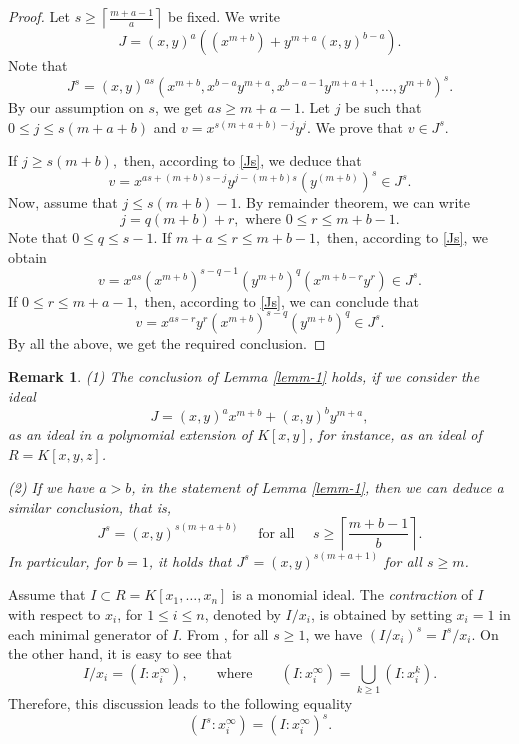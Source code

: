 \documentclass[11pt]{amsart}
\newtheorem{remark}[theorem]{Remark}
\begin{document}
\begin{proof}
Let  $s\geq \left\lceil \frac{m+a-1}{a} \right\rceil$ be fixed.
We write $$J=(x,y)^a ( (x^{m+b}) + y^{m+a}(x,y)^{b-a}).$$ Note that
\begin{equation}\label{Js}
J^s = (x,y)^{as}(x^{m+b},x^{b-a}y^{m+a},x^{b-a-1}y^{m+a+1},\ldots, y^{m+b})^s.
\end{equation}
By our assumption on $s$, we get $as\geq m+a-1$. Let $j$ be  such that \linebreak $0\leq j\leq s(m+a+b)$
and $v=x^{s(m+a+b)-j}y^j$. We prove that $v\in J^s$.  

If $j\geq s(m+b),$ then, according to \eqref{Js}, we deduce that 
$$v= x^{as+(m+b)s-j} y^{j-(m+b)s} (y^{(m+b)})^s \in J^s.$$
Now, assume that $j\leq s(m+b)-1$. By remainder theorem, we can write
$$j = q(m+b) + r,\text{ where }0\leq r \leq m+b-1.$$
Note that $0\leq q\leq s-1$. If $m+a\leq r\leq m+b-1,$ then, according to \eqref{Js}, we obtain 
$$v =  x^{as} (x^{m+b})^{s-q-1}(y^{m+b})^q (x^{m+b-r}y^r) \in J^s.$$
If $0 \leq r\leq m+a-1,$ then, according to \eqref{Js}, we can conclude that 
$$v =  x^{as-r} y^r (x^{m+b})^{s-q}(y^{m+b})^q \in J^s.$$ 
By all the above, we get the required conclusion.
\end{proof}

\begin{remark}\label{remmy}
(1) The conclusion of Lemma \ref{lemm-1} holds, if we consider the ideal 
$$J=(x,y)^a x^{m+b} + (x,y)^b y^{m+a},$$
as an ideal in a polynomial extension of $K[x,y]$, for instance, as an ideal of $R=K[x,y,z]$.

(2) If we have $a>b$, in the statement of Lemma \ref{lemm-1}, then we can deduce a similar conclusion, that is,  
$$J^s = (x,y)^{s(m+a+b)} \quad  \text{ for all }     \quad  s\geq \left\lceil \frac{m+b-1}{b} \right\rceil.$$
In particular, for $b=1$, it holds that $J^s=(x,y)^{s(m+a+1)}$  for all $s\geq m$.
\end{remark}

Assume that \(I\subset R=K[x_1,\ldots,x_n]\) is a monomial ideal.
The \textit{contraction} of \(I\) with respect to \(x_i\), for \(1\le i\le n\), denoted by $I/x_i$,
is obtained by setting \(x_i=1\) in each minimal generator of \(I\).
From \cite[Lemma~3.18(ii)]{SN}, for all $s\geq 1$, we have $(I/x_i)^s=I^s/x_i$. On the other hand, it is easy to see that 
\[
I/{x_i}=(I:x_i^\infty),
\qquad\text{where}\qquad
(I:x_i^\infty)=\bigcup_{k\geq 1}(I:x_i^k).
\]
Therefore, this discussion leads to the  following equality 
\begin{equation} \label{4.1}
(I^s:x_i^\infty)=(I:x_i^\infty)^s.
 \end{equation}
\end{document}
